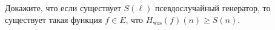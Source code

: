 Докажите, что если существует $S(\ell)$ псевдослучайный генератор, то существует такая функция $f \in E$,
что $H_{\mathrm{wrs}}(f)(n) \ge S(n)$.